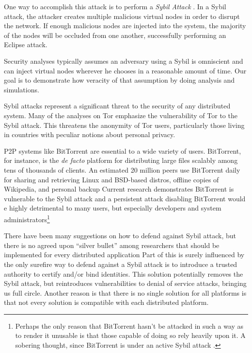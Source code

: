 \documentclass[a4paper]{article}
\begin{document}
One way to accomplish this attack is to perform a \emph{Sybil Attack} \cite{sybil}.
In a Sybil attack, the attacker creates multiple malicious virtual nodes in order to disrupt the network.
If enough malicious nodes are injected into the system, the majority of the nodes will be occluded from one another, successfully performing an Eclipse attack.

Security analyses typically assumes an adversary using a Sybil is omniscient and can inject virtual nodes wherever he chooses in a reasonable amount of time. 
Our goal is to demonstrate how veracity of that assumption by doing analysis and simulations.

Sybil attacks represent a significant threat to the security of any distributed system.
Many of the analyses \cite{bauer2007low} on Tor \cite{dingledine2004tor} emphasize the vulnerability of Tor to the Sybil attack.
This threatens the anonymity of Tor users, particularly those living in countries with peculiar notions about personal privacy.

P2P systems like BitTorrent are essential to a wide variety of users.
BitTorrent, for instance, is the \textit{de facto} platform for distributing large files scalably among tens of thousands of clients.
An estimated 20 million peers use BitTorrent daily for sharing and retrieving Linux and BSD-based distros, offline copies of Wikipedia, and personal backup
Current research demonstrates  BitTorrent is vulnerable to the Sybil attack and a persistent attack disabling BitTorrent would e highly detrimental to many users, but especially developers and system administrators\footnote{Perhaps the only reason that BitTorrent hasn't be attacked in such a way as to render it unusable is that those capable of doing so rely heavily upon it.  A sobering thought, since BitTorrent is under an active Sybil attack \cite{sybilbit}. }


There have been many suggestions on how to defend against Sybil attack, but there is no agreed upon ``silver bullet'' among researchers that should be implemented for every distributed application \cite{levine2006survey}
Part of this is surely influenced by the only surefire way to defend against a Sybil attack is to introduce a trusted authority to certify and/or bind identities.
This solution potentially removes the Sybil attack, but reintroduces vulnerabilities to denial of service attacks, bringing us full circle.
Another reason is that there is no single solution for all platforms is that not every solution is compatible with each distributed platform.
\end{document}
